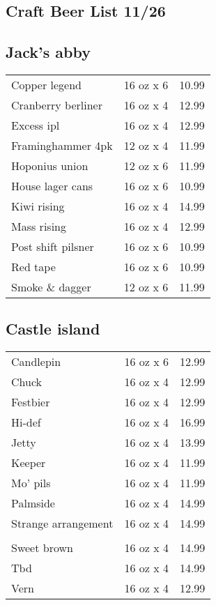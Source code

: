 \documentclass{article}%
\begin{document}
%
\pagestyle{empty}%
\normalsize%
%
\setlength{\columnseprule}{0.5pt}%
\setlength{\columnsep}{1cm}%
\renewcommand{\familydefault}{\sfdefault}%
\sffamily%
\begin{multicols}{3}%
\section*{\selectfont Craft Beer List 11/26}%

%
\subsection*{Jack's abby}%
\begin{tabular}{l c r}%
Copper legend&16 oz x 6&10.99\\%
Cranberry berliner&16 oz x 4&12.99\\%
Excess ipl&16 oz x 4&12.99\\%
Framinghammer 4pk&12 oz x 4&11.99\\%
Hoponius union&12 oz x 6&11.99\\%
House lager cans&16 oz x 6&10.99\\%
Kiwi rising&16 oz x 4&14.99\\%
Mass rising&16 oz x 4&12.99\\%
Post shift pilsner&16 oz x 6&10.99\\%
Red tape&16 oz x 6&10.99\\%
Smoke \& dagger&12 oz x 6&11.99\\%
\end{tabular}

%
\subsection*{Castle island}%
\begin{tabular}{l c r}%
Candlepin&16 oz x 6&12.99\\%
Chuck&16 oz x 4&12.99\\%
Festbier&16 oz x 4&12.99\\%
Hi{-}def&16 oz x 4&16.99\\%
Jetty&16 oz x 4&13.99\\%
Keeper&16 oz x 4&11.99\\%
Mo' pils&16 oz x 4&11.99\\%
Palmside&16 oz x 4&14.99\\%
\multirow{1}{15ex}{Strange arrangement}&16 oz x 4&14.99\\%
&&\\%
Sweet brown&16 oz x 4&14.99\\%
Tbd&16 oz x 4&14.99\\%
Vern&16 oz x 4&12.99\\%
\end{tabular}


\end{multicols}
\end{document}
